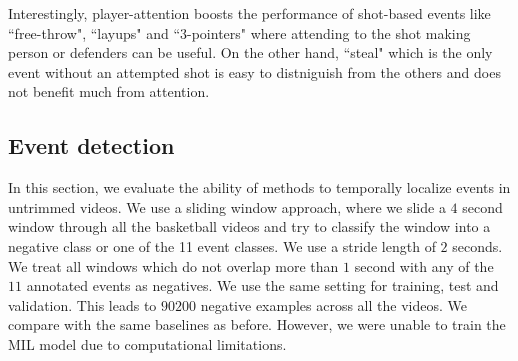 Interestingly, player-attention boosts the performance of shot-based events like
``free-throw", ``layups" and ``3-pointers" where attending to
the shot making person or defenders can be useful. On the other hand, ``steal" which
is the only event without an attempted shot is easy to distniguish
from the others and does not benefit much from attention.

\subsection{Event detection}

In this section, we evaluate the ability of methods to temporally localize
events in untrimmed videos.  We use a sliding window approach, where we slide a
$4$ second window through all the basketball videos and try to classify the
window into a negative class or one of the 11 event classes. We use a stride
length of $2$ seconds.  We treat all windows which do not overlap more than $1$
second with any of the $11$ annotated events as negatives. We use the same setting
for training, test and validation.  This leads to $90200$ negative examples
across all the videos.  We compare with the same baselines as before. However,
we were unable to train the MIL model due to computational limitations.

